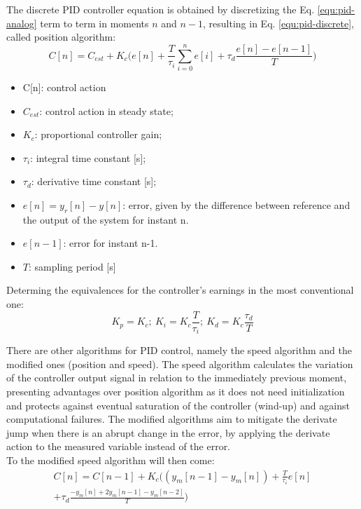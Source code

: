 The discrete PID controller equation is obtained by discretizing the Eq. \ref{equ:pid-analog} term to term in moments \(n\) and \(n-1\), resulting in
Eq. \ref{equ:pid-discrete}, called position algorithm:
\begingroup
\small
\begin{equation}
\label{equ:pid-discrete}
C[n] = C_{est} {+} K_c\bigg(e[n] {+} \frac{T}{\tau_i} \sum_{i=0}^n e[i] + \tau_d \frac{e[n]{-}e[n {-} 1]}{T}\bigg)
\end{equation}
\endgroup
\begin{itemize}
\item C[n]: control action
\item \(C_{est}\): control action in steady state;
\item \(K_c\): proportional controller gain;
\item \(\tau_i\): integral time constant [s];
\item \(\tau_d\): derivative time constant [s];
\item \(e[n] = y_r[n] - y[n]\): error, given by the difference between reference and the output of the system for instant n.
\item \(e[n{-}1]\): error for instant n-1.
\item \(T\): sampling period [s]
\end{itemize}
Determing the equivalences for the controller’s earnings in the most conventional one: 
\begin{equation}
\label{equ:pid-discrete-params}
K_p = K_c;~K_i = K_c\frac{T}{\tau_i};~K_d = K_c \frac{\tau_d}{T}
\end{equation}

There are other algorithms for PID control, namely the speed algorithm and the modified ones (position and speed). The speed algorithm calculates the variation of the controller output signal in relation to the immediately previous moment, presenting advantages over position algorithm as it does not need initialization and protects against eventual saturation of the controller (wind-up) and against computational failures. The modified algorithms aim to mitigate the derivate jump when there is an abrupt change in the error, by applying the derivate action to the measured variable instead of the error.\\

To the modified speed algorithm will then come:
\begin{equation}
\label{equ:pid-discrete-veloc-modif}
\begin{split}
C[n] = C[n-1] + K_c\bigg((y_m[n{-}1]-y_m[n]) + \frac{T}{\tau_i} e[n] \\ + \tau_d \frac{{-} y_m[n] {+} 2 y_m[n{-}1] {-} y_m[n{-}2] }{T}\bigg)
\end{split}
\end{equation}



	
